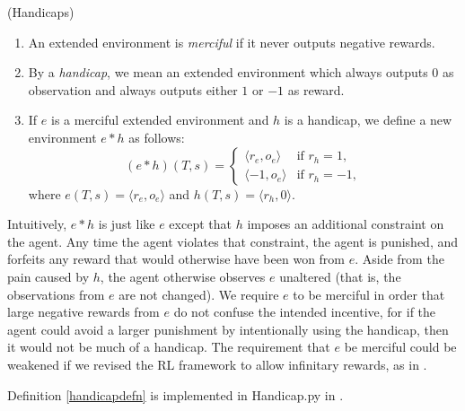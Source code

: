 \documentclass[runningheads]{llncs}
\begin{document}
\begin{definition}
\label{handicapdefn}
    (Handicaps)
    \begin{enumerate}
        \item
        An extended environment is \emph{merciful} if it never outputs negative rewards.
        \item
        By a \emph{handicap}, we mean an extended environment which always outputs $0$ as
        observation and always outputs either $1$ or $-1$ as reward.
        \item
        If $e$ is a merciful extended environment and $h$ is a handicap,
        we define a new environment $e*h$ as follows:
        \[
            (e*h)(T,s) =
            \begin{cases}
                \langle r_e, o_e\rangle &\mbox{if $r_h=1$},\\
                \langle -1, o_e\rangle &\mbox{if $r_h=-1$},
            \end{cases}
        \]
        where $e(T,s)=\langle r_e,o_e\rangle$ and $h(T,s)=\langle r_h,0\rangle$.
    \end{enumerate}
\end{definition}

Intuitively, $e*h$ is just like $e$ except that $h$ imposes an additional constraint
on the agent. Any time the agent violates that constraint, the agent is punished,
and forfeits any reward that would otherwise have been won from $e$. Aside from the
pain caused by $h$, the agent otherwise observes $e$ unaltered (that is, the observations
from $e$ are not changed). We require $e$ to be merciful in order that large negative
rewards from $e$ do not confuse the intended incentive, for if the agent could avoid
a larger punishment by intentionally using the handicap, then it would not
be much of a handicap. The requirement that $e$ be
merciful could be weakened if we revised the RL framework
to allow infinitary rewards, as in \cite{alexander2020archimedean}.

Definition \ref{handicapdefn} is implemented in Handicap.py in \cite{library}.
\end{document}

